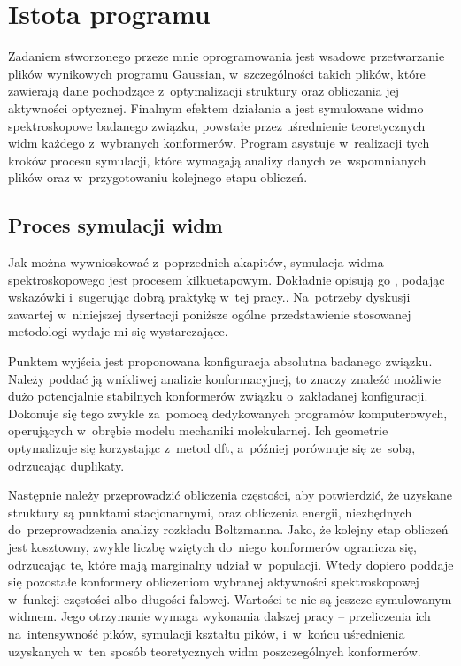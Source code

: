 \section{Istota programu}\label{tesliper:essence}
Zadaniem stworzonego przeze mnie oprogramowania jest wsadowe przetwarzanie plików wynikowych
  programu Gaussian, w~szczególności takich plików, które zawierają
  dane pochodzące z~optymalizacji struktury oraz obliczania jej aktywności optycznej.
Finalnym efektem działania \tesliper{}a jest symulowane widmo spektroskopowe badanego związku,
  powstałe przez uśrednienie teoretycznych widm każdego z~wybranych konformerów.
Program asystuje w~realizacji tych kroków procesu symulacji, które wymagają analizy danych
  ze~wspomnianych plików oraz w~przygotowaniu kolejnego etapu obliczeń.

\subsection{Proces symulacji widm}\label{essence:simulation}
Jak można wywnioskować z~poprzednich akapitów, symulacja widma spektroskopowego jest
  procesem kilkuetapowym.
Dokładnie opisują go \citeauthor{pescitelli16}, podając wskazówki i~sugerując dobrą
  praktykę w~tej pracy..
Na~potrzeby dyskusji zawartej w~niniejszej dysertacji poniższe ogólne przedstawienie
  stosowanej metodologi wydaje mi się wystarczające.

Punktem wyjścia jest proponowana konfiguracja absolutna badanego związku.
Należy poddać ją wnikliwej analizie konformacyjnej, to znaczy znaleźć możliwie dużo
  potencjalnie stabilnych konformerów związku o~zakładanej konfiguracji.
Dokonuje się tego zwykle za~pomocą dedykowanych programów komputerowych, operujących w~obrębie
  modelu mechaniki molekularnej.
Ich geometrie optymalizuje się korzystając z~metod \gls{dft}, a~później porównuje się ze~sobą,
  odrzucając duplikaty.

Następnie należy przeprowadzić obliczenia częstości, aby potwierdzić, że uzyskane
  struktury są punktami stacjonarnymi, oraz obliczenia energii, niezbędnych do~przeprowadzenia
  analizy rozkładu Boltzmanna.
Jako, że kolejny etap obliczeń jest kosztowny,
  zwykle liczbę wziętych do~niego konformerów ogranicza się, odrzucając te, które mają marginalny
  udział w~populacji.
Wtedy dopiero poddaje się pozostałe konformery obliczeniom wybranej aktywności spektroskopowej
  w~funkcji częstości albo długości falowej.
Wartości te nie są jeszcze symulowanym widmem.
Jego otrzymanie wymaga wykonania dalszej pracy \--- przeliczenia ich na~intensywność pików,
  symulacji kształtu pików, i~w~końcu uśrednienia uzyskanych w~ten sposób teoretycznych widm
  poszczególnych konformerów.


